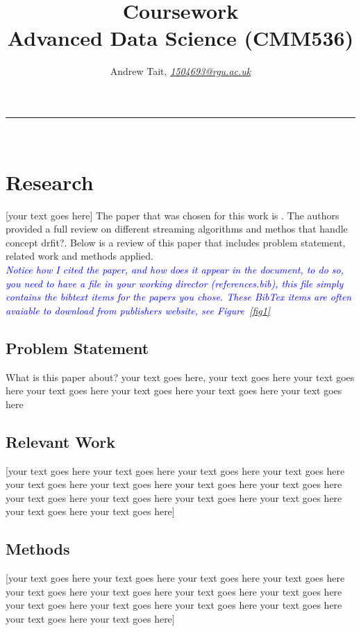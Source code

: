 \documentclass[10pt  ,usenames, dvipsnames]{article}\usepackage[]{graphicx}\usepackage[]{color}
\begin{document}
\title{\LARGE Coursework  \\ Advanced Data Science (CMM536)}

\author{Andrew Tait, \textit{\href{1504693@rgu.ac.uk}{1504693@rgu.ac.uk}}}
\maketitle
\noindent\rule{16cm}{0.4pt}
\ \\

\section{Research}

[your text goes here]
The paper that was chosen for this work is \cite{6779381}. The authors provided a full review on different streaming algorithms and methos that handle concept drfit?. Below is a review of this paper that includes problem statement, related work and methods applied.\\

\textcolor{blue}{\textit{Notice how I cited the paper, and how does it appear in the document, to do so, you need to have a file in your working director (references.bib), this file simply contains the bibtext items for the papers you chose. These BibTex items are often avaiable to download from publishers website, see Figure~\ref{fig1}}}
\subsection{Problem Statement}
What is this paper about? your text goes here, your text goes here your text goes here your text goes here your text goes here your text goes here your text goes here

\subsection{Relevant Work}
[your text goes here your text goes here your text goes here your text goes here your text goes here your text goes here your text goes here your text goes here your text goes here your text goes here your text goes here your text goes here your text goes here your text goes here]
\subsection{Methods}
[your text goes here your text goes here your text goes here your text goes here your text goes here your text goes here your text goes here your text goes here your text goes here your text goes here your text goes here your text goes here your text goes here your text goes here]
\end{document}
